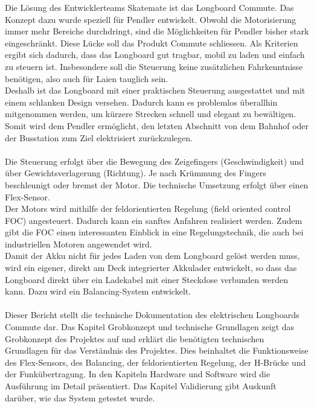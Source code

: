 Die Lösung des Entwicklerteams Skatemate ist das Longboard Commute. Das Konzept dazu wurde speziell für Pendler entwickelt. 
Obwohl die Motorisierung immer mehr Bereiche durchdringt, sind die Möglichkeiten für Pendler bisher stark eingeschränkt. Diese Lücke soll das Produkt Commute schliessen.
Als Kriterien ergibt sich dadurch, dass das Longboard gut tragbar, mobil zu laden und einfach zu steuern ist. Insbesondere soll die Steuerung keine zusätzlichen Fahrkenntnisse benötigen, also auch für Laien tauglich sein.\\
Deshalb ist das Longboard mit einer praktischen Steuerung ausgestattet und mit einem schlanken Design versehen. Dadurch kann es problemlos überallhin mitgenommen werden, um kürzere Strecken schnell und elegant zu bewältigen. Somit wird dem Pendler ermöglicht, den letzten Abschnitt von dem Bahnhof oder der Busstation zum Ziel elektrisiert zurückzulegen. 
\\ \\
Die Steuerung erfolgt über die Bewegung des Zeigefingers (Geschwindigkeit) und über Gewichtsverlagerung (Richtung). Je nach Krümmung des Fingers beschleunigt oder bremst der Motor. Die technische Umsetzung erfolgt über einen Flex-Sensor. \\
Der Motors wird mithilfe der feldorientierten Regelung (field oriented control FOC) angesteuert. Dadurch kann ein sanftes Anfahren realisiert werden. Zudem gibt die FOC einen interessanten Einblick in eine Regelungstechnik, die auch bei industriellen Motoren angewendet wird. \\
Damit der Akku nicht für jedes Laden von dem Longboard gelöst werden muss, wird ein eigener, direkt am Deck integrierter Akkulader entwickelt, so dass das Longboard direkt über ein Ladekabel mit einer Steckdose verbunden werden kann. Dazu wird ein Balancing-System entwickelt.
\\\\
Dieser Bericht stellt die technische Dokumentation des elektrischen Longboards Commute dar. Das Kapitel Grobkonzept und technische Grundlagen zeigt das Grobkonzept des Projektes auf und erklärt die benötigten technischen Grundlagen für das Verständnis des Projektes. Dies beinhaltet die Funktionsweise des Flex-Sensors, des Balancing, der feldorientierten Regelung, der H-Brücke und der Funkübertragung. In den Kapiteln Hardware und Software wird die Ausführung im Detail präsentiert. Das Kapitel Validierung gibt Auskunft darüber, wie das System getestet wurde. 
